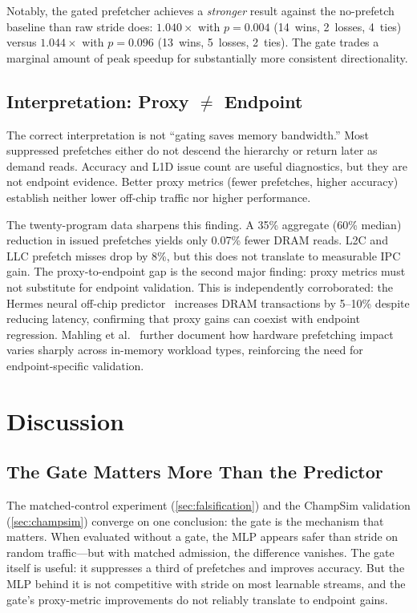 \documentclass[sigplan,anonymous,review,nonacm]{acmart}
\begin{document}
Notably, the gated prefetcher achieves a \emph{stronger} result against the
no-prefetch baseline than raw stride does: $1.040\times$ with $p = 0.004$
(14~wins, 2~losses, 4~ties) versus $1.044\times$ with $p = 0.096$
(13~wins, 5~losses, 2~ties). The gate trades a marginal amount of peak
speedup for substantially more consistent directionality.

\subsection{Interpretation: Proxy $\neq$ Endpoint}

The correct interpretation is not ``gating saves memory bandwidth.'' Most
suppressed prefetches either do not descend the hierarchy or return later as
demand reads. Accuracy and L1D issue count are useful diagnostics, but they
are not endpoint evidence. Better proxy metrics (fewer prefetches, higher
accuracy) establish neither lower off-chip traffic nor higher performance.

The twenty-program data sharpens this finding. A 35\% aggregate (60\%
median) reduction in issued prefetches yields only 0.07\% fewer DRAM reads.
L2C and LLC prefetch misses drop by 8\%, but this does not translate to
measurable IPC gain. The proxy-to-endpoint gap is the second major finding:
proxy metrics must not substitute for endpoint validation.
This is independently corroborated: the Hermes neural off-chip
predictor~\cite{hermes} increases DRAM transactions by 5--10\% despite
reducing latency, confirming that proxy gains can coexist with endpoint
regression. Mahling et al.~\cite{mahling2025} further document how
hardware prefetching impact varies sharply across in-memory workload
types, reinforcing the need for endpoint-specific validation.

\section{Discussion}
\label{sec:discussion}

\subsection{The Gate Matters More Than the Predictor}

The matched-control experiment (\cref{sec:falsification}) and the ChampSim
validation (\cref{sec:champsim}) converge on one conclusion: the gate is
the mechanism that matters. When evaluated without a gate, the MLP appears
safer than stride on random traffic---but with matched admission, the
difference vanishes. The gate itself is useful: it suppresses a third of
prefetches and improves accuracy. But the MLP behind it is not competitive
with stride on most learnable streams, and the gate's proxy-metric
improvements do not reliably translate to endpoint gains.
\end{document}
